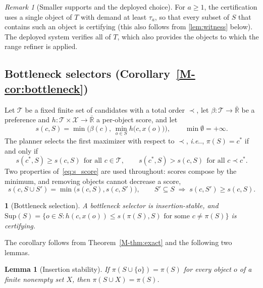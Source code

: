 \documentclass[10pt,letterpaper]{article}
\makeatletter
\DeclareRobustCommand\onedot{\futurelet\@let@token\@onedot}
\def\@onedot{\ifx\@let@token.\else.\null\fi\xspace}
\def\ie{\emph{i.e}\onedot} \def\Ie{\emph{I.e}\onedot}
\newcommand{\Sup}{\mathrm{Sup}}
\newcommand{\policy}{\pi}
\newtheorem{lemma}{Lemma}
\theoremstyle{remark}
\newtheorem{remark}{Remark}
\theoremstyle{plain}
\newtheorem*{restatedinner}{\restatedname}
\newcommand{\restatedname}{}
\newenvironment{restated}[3]{\renewcommand{\restatedname}{#1~#2}\begin{restatedinner}[#3]}{\end{restatedinner}}
\theoremstyle{definition}
\newcommand{\mrefnum}[1]{\ref*{M-#1}}
\makeatother
\begin{document}
\begin{remark}[Smaller supports and the deployed choice]
For $a\ge1$, the certification uses a single object of $T$ with demand at least $\tau_a$, so that every subset of $S$ that contains such an object is certifying (this also follows from \cref{lem:witness} below).
The deployed system verifies all of $T$, which also provides the objects to which the range refiner is applied.
\end{remark}

\subsection{Bottleneck selectors (Corollary~\protect\mrefnum{cor:bottleneck})}
\label{sec:proof_bottleneck}

Let $\mathcal{T}$ be a fixed finite set of candidates with a total order $\prec$, let $\beta:\mathcal{T}\to\bar{\mathbb{R}}$ be a preference and $h:\mathcal{T}\times\mathcal{X}\to\bar{\mathbb{R}}$ a per-object score, and let
\begin{equation}
s(c,S)=\min\Big(\beta(c),\,\min_{o\in S}h\big(c,x(o)\big)\Big),\qquad \min\emptyset=+\infty .
\label{eq:s_score}
\end{equation}
The planner selects the first maximizer with respect to $\prec$, \ie, $\policy(S)=c^\ast$ if and only if
\begin{equation}
s(c^\ast,S)\ge s(c,S)\ \ \text{for all }c\in\mathcal{T},\qquad s(c^\ast,S)>s(c,S)\ \ \text{for all }c\prec c^\ast.
\label{eq:s_first}
\end{equation}
Two properties of~\cref{eq:s_score} are used throughout: scores compose by the minimum, and removing objects cannot decrease a score,
\begin{equation}
s(c,S\cup S')=\min\big(s(c,S),s(c,S')\big),\qquad S'\subseteq S\;\Rightarrow\;s(c,S')\ge s(c,S).
\label{eq:s_props}
\end{equation}

\begin{restated}{Corollary}{\mrefnum{cor:bottleneck}}{Bottleneck selection}
A bottleneck selector is insertion-stable, and $\Sup(S)=\{o\in S:h(c,x(o))\le s(\policy(S),S)\text{ for some }c\neq\policy(S)\}$ is certifying.
\end{restated}

The corollary follows from Theorem~\mrefnum{thm:exact} and the following two lemmas.

\begin{lemma}[Insertion stability]
\label{lem:insertion}
If $\policy(S\cup\{o\})=\policy(S)$ for every object $o$ of a finite nonempty set $X$, then $\policy(S\cup X)=\policy(S)$.
\end{lemma}
\end{document}
